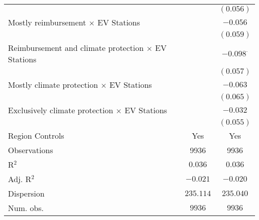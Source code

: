 \begin{center}
\begin{tiny}
\begin{longtable}{l@{} c@{} c@{}}
                                                                                                       &                 & $(0.056)$        \\
\quad Mostly reimbursement $\times$ EV Stations                                                        &                 & $-0.056$         \\
                                                                                                       &                 & $(0.059)$        \\
\quad Reimbursement and climate protection $\times$ EV Stations                                        &                 & $-0.098^{\cdot}$ \\
                                                                                                       &                 & $(0.057)$        \\
\quad Mostly climate protection $\times$ EV Stations                                                   &                 & $-0.063$         \\
                                                                                                       &                 & $(0.065)$        \\
\quad Exclusively climate protection $\times$ EV Stations                                              &                 & $-0.032$         \\
                                                                                                       &                 & $(0.055)$        \\
\hline
Region Controls                                                                                        & Yes             & Yes              \\
Observations                                                                                           & 9936            & 9936             \\
R$^2$                                                                                                  & $0.036$         & $0.036$          \\
Adj. R$^2$                                                                                             & $-0.021$        & $-0.020$         \\
Dispersion                                                                                             & $235.114$       & $235.040$        \\
Num. obs.                                                                                              & $9936$          & $9936$           \\
\end{longtable}
\end{tiny}
\end{center}
